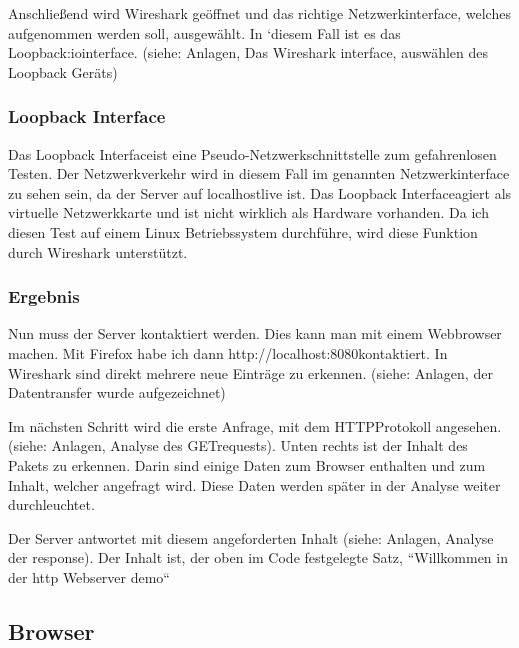 \documentclass[12pt]{article}
\begin{document}
Anschließend wird Wireshark geöffnet und das richtige Netzwerkinterface, welches aufgenommen werden soll, ausgewählt. In `diesem Fall ist es das \glq Loopback:io\grq interface. (siehe: Anlagen, Das Wireshark interface, auswählen des Loopback Geräts)
\subsubsection{Loopback Interface}

Das \glq Loopback Interface\grq ist eine \glqq Pseudo-Netzwerkschnittstelle zum gefahrenlosen Testen\grqq\cite{loopback-munich}. Der Netzwerkverkehr wird in diesem Fall im genannten Netzwerkinterface zu sehen sein, da der Server auf \glq localhost\grq live ist. Das \glq Loopback Interface\grq agiert als virtuelle Netzwerkkarte und ist nicht wirklich als Hardware vorhanden. Da ich diesen Test auf einem Linux Betriebssystem durchführe, wird diese Funktion durch Wireshark unterstützt.\cite{loopback-wireshark}

\subsubsection{Ergebnis}

Nun muss der Server kontaktiert werden. Dies kann man mit einem Webbrowser machen. Mit Firefox habe ich dann \glq http://localhost:8080\grq kontaktiert. In Wireshark sind direkt mehrere neue Einträge zu erkennen. (siehe: Anlagen, der Datentransfer wurde aufgezeichnet)

Im nächsten Schritt wird die erste Anfrage, mit dem \glq HTTP\grq Protokoll angesehen. (siehe: Anlagen, Analyse des \glq GET\grq requests). Unten rechts ist der Inhalt des Pakets zu erkennen. Darin sind einige Daten zum Browser enthalten und zum Inhalt, welcher angefragt wird. Diese Daten werden später in der Analyse weiter durchleuchtet.

Der Server antwortet mit diesem angeforderten Inhalt (siehe: Anlagen, Analyse der response). Der Inhalt ist, der oben im Code festgelegte Satz, ``Willkommen in der http Webserver demo``

\subsection{Browser}
\end{document}
